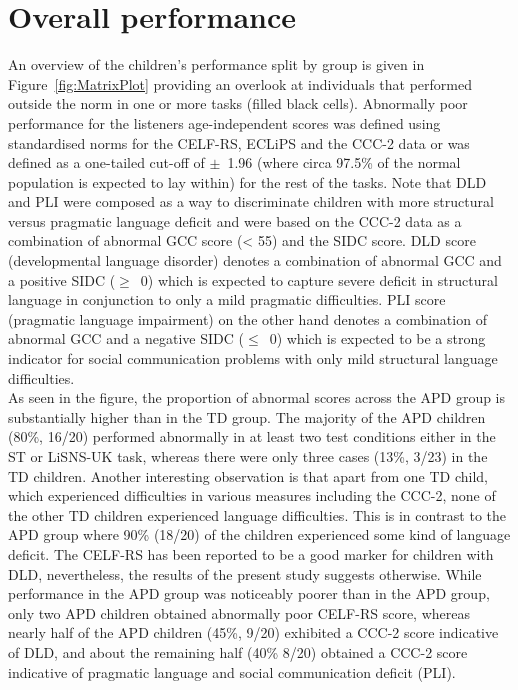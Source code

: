 \documentclass[a4paper, twoside]{templates/ociamthesis}
\begin{document}
\hypertarget{overall-performance}{%
\section{Overall performance}\label{overall-performance}}

An overview of the children's performance split by group is given in Figure~\ref{fig:MatrixPlot} providing an overlook at individuals that performed outside the norm in one or more tasks (filled black cells). Abnormally poor performance for the listeners age-independent scores was defined using standardised norms for the CELF-RS, ECLiPS and the CCC-2 data or was defined as a one-tailed cut-off of \(\pm\)~1.96 (where circa 97.5\% of the normal population is expected to lay within) for the rest of the tasks. Note that DLD and PLI were composed as a way to discriminate children with more structural versus pragmatic language deficit and were based on the CCC-2 data as a combination of abnormal GCC score (\textless{} 55) and the SIDC score. DLD score (developmental language disorder) denotes a combination of abnormal GCC and a positive SIDC (\(\geq\)~0) which is expected to capture severe deficit in structural language in conjunction to only a mild pragmatic difficulties. PLI score (pragmatic language impairment) on the other hand denotes a combination of abnormal GCC and a negative SIDC (\(\leq\)~0) which is expected to be a strong indicator for social communication problems with only mild structural language difficulties.\\

As seen in the figure, the proportion of abnormal scores across the APD group is substantially higher than in the TD group. The majority of the APD children (80\%, 16/20) performed abnormally in at least two test conditions either in the ST or LiSNS-UK task, whereas there were only three cases (13\%, 3/23) in the TD children. Another interesting observation is that apart from one TD child, which experienced difficulties in various measures including the CCC-2, none of the other TD children experienced language difficulties. This is in contrast to the APD group where 90\% (18/20) of the children experienced some kind of language deficit. The CELF-RS has been reported to be a good marker for children with DLD, nevertheless, the results of the present study suggests otherwise. While performance in the APD group was noticeably poorer than in the APD group, only two APD children obtained abnormally poor CELF-RS score, whereas nearly half of the APD children (45\%, 9/20) exhibited a CCC-2 score indicative of DLD, and about the remaining half (40\% 8/20) obtained a CCC-2 score indicative of pragmatic language and social communication deficit (PLI).\\
\end{document}
